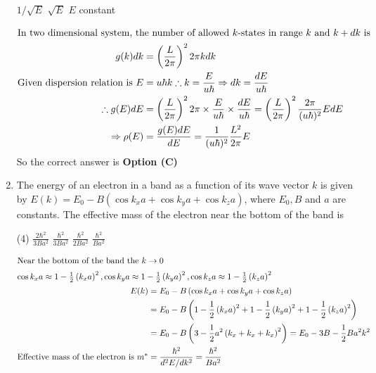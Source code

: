 \begin{enumerate}
\begin{tasks}
\task[\textbf{A.}] $1 / \sqrt{E}$
\task[\textbf{B.}] $\sqrt{E}$
\task[\textbf{C.}] $E$
\task[\textbf{D.}] constant
\end{tasks}
\begin{answer}
\begin{align*}
\intertext{In two dimensional system, the number of allowed $k$-states in range $k$ and $k+d k$ is}
g(k) d k&=\left(\frac{L}{2 \pi}\right)^{2} 2 \pi k d k\\
\text{Given dispersion relation is }E&=u \hbar k \therefore k=\frac{E}{u \hbar} \Rightarrow d k=\frac{d E}{u \hbar}\\
\therefore g(E) d E&=\left(\frac{L}{2 \pi}\right)^{2} 2 \pi \times \frac{E}{u \hbar} \times \frac{d E}{u \hbar}=\left(\frac{L}{2 \pi}\right)^{2} \frac{2 \pi}{(u \hbar)^{2}} E d E\\
\Rightarrow \rho(E)&=\frac{g(E) d E}{d E}=\frac{1}{(u \hbar)^{2}} \frac{L^{2}}{2 \pi} E
\end{align*}
So the correct answer is \textbf{Option (C)}
\end{answer}
	\item The energy of an electron in a band as a function of its wave vector $k$ is given by $E(k)=E_{0}-B\left(\cos k_{x} a+\cos k_{y} a+\cos k_{z} a\right)$, where $E_{0}, B$ and $a$ are constants. The effective mass of the electron near the bottom of the band is
	{}
\begin{tasks}(4)
\task[\textbf{A.}] $\frac{2 \hbar^{2}}{3 B a^{2}}$
\task[\textbf{B.}] $\frac{\hbar^{2}}{3 B a^{2}}$
\task[\textbf{C.}] $\frac{\hbar^{2}}{2 B a^{2}}$
\task[\textbf{D.}] $\frac{\hbar^{2}}{B a^{2}}$
\end{tasks}
\begin{answer}
\begin{align*}
\intertext{Near the bottom of the band the $k \rightarrow 0$}
\intertext{$\cos k_{x} a \approx 1-\frac{1}{2}\left(k_{x} a\right)^{2}, \cos k_{y} a \approx 1-\frac{1}{2}\left(k_{y} a\right)^{2}, \cos k_{z} a \approx 1-\frac{1}{2}\left(k_{z} a\right)^{2}$}
E(k)&=E_{0}-B\left(\cos k_{x} a+\cos k_{y} a+\cos k_{z} a\right)\\&=E_{0}-B\left(1-\frac{1}{2}\left(k_{x} a\right)^{2}+1-\frac{1}{2}\left(k_{y} a\right)^{2}+1-\frac{1}{2}\left(k_{z} a\right)^{2}\right)\\
&=E_{0}-B\left(3-\frac{1}{2} a^{2}\left(k_{x}+k_{x}+k_{x}\right)^{2}\right)=E_{0}-3 B-\frac{1}{2} B a^{2} k^{2}\\
\text{Effective mass of the electron is }m^{*}&=\frac{\hbar^{2}}{d^{2} E / d k^{2}}=\frac{\hbar^{2}}{B a^{2}}

\end{align*}
\end{answer}
\end{enumerate}
